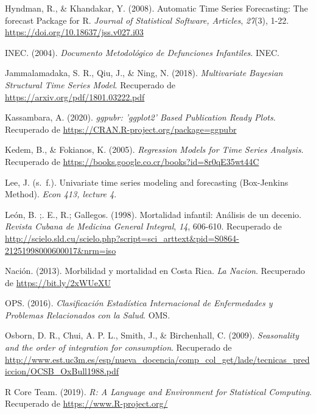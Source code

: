 \documentclass[
]{article}
\newlength{\cslhangindent}
\newlength{\cslentryspacingunit} %
\newenvironment{CSLReferences}[2] %
 {%
  \setlength{\parindent}{0pt}
  \ifodd #1
  \let\oldpar\par
  \def\par{\hangindent=\cslhangindent\oldpar}
  \fi
  \setlength{\parskip}{#2\cslentryspacingunit}
 }%
 {}
\begin{document}
\begin{CSLReferences}{1}{0}
\leavevmode{}%
Hyndman, R., \& Khandakar, Y. (2008). Automatic Time Series Forecasting:
The forecast Package for R. \emph{Journal of Statistical Software,
Articles}, \emph{27}(3), 1-22.
\url{https://doi.org/10.18637/jss.v027.i03}

\leavevmode{}%
INEC. (2004). \emph{Documento Metodológico de Defunciones Infantiles}.
INEC.

\leavevmode{}%
Jammalamadaka, S. R., Qiu, J., \& Ning, N. (2018). \emph{Multivariate
Bayesian Structural Time Series Model}. Recuperado de
\url{https://arxiv.org/pdf/1801.03222.pdf}

\leavevmode{}%
Kassambara, A. (2020). \emph{ggpubr: 'ggplot2' Based Publication Ready
Plots}. Recuperado de \url{https://CRAN.R-project.org/package=ggpubr}

\leavevmode{}%
Kedem, B., \& Fokianos, K. (2005). \emph{Regression Models for Time
Series Analysis}. Recuperado de
\url{https://books.google.co.cr/books?id=8r0qE35wt44C}

\leavevmode{}%
Lee, J. (s.~f.). Univariate time series modeling and forecasting
(Box-Jenkins Method). \emph{Econ 413, lecture 4}.

\leavevmode{}%
León, B. ;. E., R.; Gallegos. (1998). {Mortalidad infantil: Análisis de
un decenio}. \emph{{Revista Cubana de Medicina General Integral}},
\emph{14}, 606-610. Recuperado de
\url{http://scielo.sld.cu/scielo.php?script=sci_arttext\&pid=S0864-21251998000600017\&nrm=iso}

\leavevmode{}%
Nación. (2013). Morbilidad y mortalidad en Costa Rica. \emph{La Nacion}.
Recuperado de \url{https://bit.ly/2xWUeXU}

\leavevmode{}%
OPS. (2016). \emph{Clasificación Estadística Internacional de
Enfermedades y Problemas Relacionados con la Salud}. OMS.

\leavevmode{}%
Osborn, D. R., Chui, A. P. L., Smith, J., \& Birchenhall, C. (2009).
\emph{Seasonality and the order of integration for consumption}.
Recuperado de
\url{http://www.est.uc3m.es/esp/nueva_docencia/comp_col_get/lade/tecnicas_prediccion/OCSB_OxBull1988.pdf}

\leavevmode{}%
R Core Team. (2019). \emph{R: A Language and Environment for Statistical
Computing}. Recuperado de \url{https://www.R-project.org/}


\end{CSLReferences}
\end{document}
